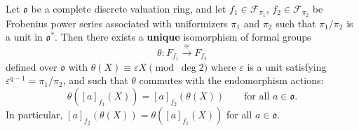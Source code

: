 Let $\mathfrak{o}$ be a complete discrete valuation ring, and let $f_1 \in \mathcal{F}_{\pi_1}$, $f_2 \in \mathcal{F}_{\pi_2}$ be Frobenius power series associated with uniformizers $\pi_1$ and $\pi_2$ such that $\pi_1 / \pi_2$ is a unit in $\mathfrak{o}^*$. Then there exists a \textbf{unique} isomorphism of formal groups
$$
\theta: F_{f_1} \xrightarrow{\cong} F_{f_2}
$$
defined over $\mathfrak{o}$ with $\theta(X) \equiv \varepsilon X \pmod{\deg 2}$ where $\varepsilon$ is a unit satisfying $\varepsilon^{q-1} = \pi_1/\pi_2$, and such that $\theta$ commutes with the endomorphism actions:
$$
\theta([a]_{f_1}(X)) = [a]_{f_2}(\theta(X)) \qquad \text{for all } a \in \mathfrak{o}.
$$
In particular, $[a]_{f_2}(\theta(X)) = \theta([a]_{f_1}(X))$ for all $a \in \mathfrak{o}$.
